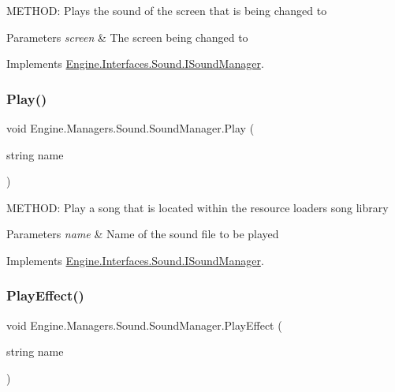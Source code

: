 M\+E\+T\+H\+OD\+: Plays the sound of the screen that is being changed to 


\begin{DoxyParams}{Parameters}
{\em screen} & The screen being changed to\\
\hline
\end{DoxyParams}


Implements \hyperlink{a00482_a8aa47dcffde058c1146f7ebf5b0edb84}{Engine.\+Interfaces.\+Sound.\+I\+Sound\+Manager}.

\mbox{\label{a00546_aabfeb911d8bd573065e9c02d3f81e582}} 
\subsubsection{\texorpdfstring{Play()}{Play()}}
{\footnotesize\ttfamily void Engine.\+Managers.\+Sound.\+Sound\+Manager.\+Play (\begin{DoxyParamCaption}\item[{string}]{name }\end{DoxyParamCaption})\hspace{0.3cm}{\ttfamily [inline]}}



M\+E\+T\+H\+OD\+: Play a song that is located within the resource loaders song library 


\begin{DoxyParams}{Parameters}
{\em name} & Name of the sound file to be played\\
\hline
\end{DoxyParams}


Implements \hyperlink{a00482_aec02346c5397b9b01b9d5d6baedc923e}{Engine.\+Interfaces.\+Sound.\+I\+Sound\+Manager}.

\mbox{\label{a00546_a6613813ccd38703484e80ca8775ecdf8}} 
\subsubsection{\texorpdfstring{Play\+Effect()}{PlayEffect()}}
{\footnotesize\ttfamily void Engine.\+Managers.\+Sound.\+Sound\+Manager.\+Play\+Effect (\begin{DoxyParamCaption}\item[{string}]{name }\end{DoxyParamCaption})\hspace{0.3cm}{\ttfamily [inline]}}



